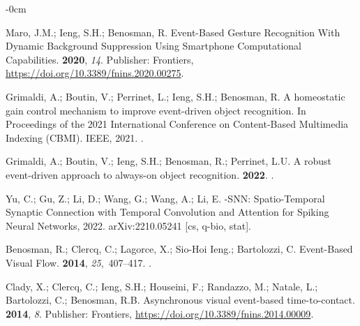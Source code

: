 \documentclass[brainsci, %
               review,submit,pdftex,moreauthors
               ]{Definitions/mdpi}
\begin{document}
\begin{adjustwidth}{-\extralength}{0cm}
\begin{thebibliography}{999}
  Maro, J.M.; Ieng, S.H.; Benosman, R.
  \newblock Event-{Based} {Gesture} {Recognition} {With} {Dynamic} {Background}
    {Suppression} {Using} {Smartphone} {Computational} {Capabilities}.
   {\bf 2020}, {\em 14}.
  \newblock Publisher: Frontiers,
    {\url{https://doi.org/10.3389/fnins.2020.00275}}.
  
  Grimaldi, A.; Boutin, V.; Perrinet, L.; Ieng, S.H.; Benosman, R.
  \newblock A homeostatic gain control mechanism to improve event-driven object
    recognition.
  \newblock In Proceedings of the 2021 {International} {Conference} on
    {Content}-{Based} {Multimedia} {Indexing} ({CBMI}). IEEE,  2021.
  .
  
  Grimaldi, A.; Boutin, V.; Ieng, S.H.; Benosman, R.; Perrinet, L.U.
  \newblock A robust event-driven approach to always-on object recognition.
   {\bf 2022}.
  .
  
  Yu, C.; Gu, Z.; Li, D.; Wang, G.; Wang, A.; Li, E.
  -{SNN}: {Spatio}-{Temporal} {Synaptic} {Connection} with
    {Temporal} {Convolution} and {Attention} for {Spiking} {Neural} {Networks},
    2022.
  \newblock arXiv:2210.05241 [cs, q-bio, stat].
  
  Benosman, R.; Clercq, C.; Lagorce, X.; {Sio-Hoi Ieng}.; Bartolozzi, C.
  \newblock Event-{Based} {Visual} {Flow}.
   {\bf
    2014}, {\em 25},~407--417.
  .
  
  Clady, X.; Clercq, C.; Ieng, S.H.; Houseini, F.; Randazzo, M.; Natale, L.;
    Bartolozzi, C.; Benosman, R.B.
  \newblock Asynchronous visual event-based time-to-contact.
   {\bf 2014}, {\em 8}.
   Publisher: Frontiers,
    {\url{https://doi.org/10.3389/fnins.2014.00009}}.
  

\end{thebibliography}
\end{adjustwidth}
\end{document}
